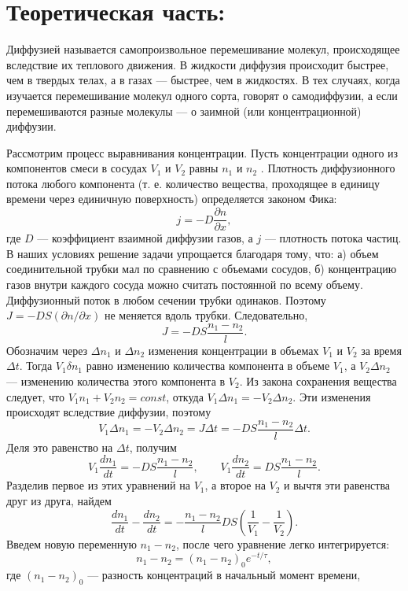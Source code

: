 \documentclass[a4paper, fontsize=12bp]{article}
\begin{document}
\section*{Теоретическая часть:}
Диффузией называется самопроизвольное перемешивание молекул, происходящее вследствие их теплового движения. В жидкости
диффузия происходит быстрее, чем в твердых телах, а в газах --- быстрее, чем в жидкостях. В тех случаях, когда изучается перемешивание молекул одного сорта, говорят о самодиффузии, а если перемешиваются разные молекулы --- о заимной (или концентрационной)
диффузии.

Рассмотрим процесс выравнивания концентрации. Пусть концентрации одного из компонентов смеси в сосудах $V_1$ и $V_2$ равны $n_1$ и
$n_2$ . Плотность диффузионного потока любого компонента (т. е. количество вещества, проходящее в единицу времени через единичную
поверхность) определяется законом Фика:
\[
j = - D \frac{\partial n}{\partial x},
\]
где $D$ --- коэффициент взаимной диффузии газов, а $j$ --- плотность
потока частиц. В наших условиях решение задачи упрощается благодаря тому, что: а) объем соединительной трубки мал по сравнению
с объемами сосудов, б) концентрацию газов внутри каждого сосуда
можно считать постоянной по всему объему. Диффузионный поток в
любом сечении трубки одинаков. Поэтому $J = - D S (\partial n / \partial x )$ не меняется вдоль трубки. Следовательно,
\[
	J = - D S \frac{n_1 - n_2}{l}.
\]
Обозначим через $\Delta n_1$ и $\Delta n_2$  изменения концентрации в объемах $V_1$ и $V_2$ за время $\Delta t$. Тогда $V_1 \delta n_1$ равно изменению количества компонента в объеме $V_1$, а $V_2 \Delta n_2$ --- изменению количества этого компонента в $V_2$. Из закона сохранения вещества следует, что $V_1 n_1 + V_2 n_2 = const$, откуда $V_1 \Delta n_1 = - V_2 \Delta n_2$. Эти изменения происходят вследствие диффузии, поэтому
\[
	V_1 \Delta n_1 = -V_2 \Delta n_2 = J \Delta t = -DS \frac{n_1 - n_2}{l} \Delta t.
\]
Деля это равенство на $\Delta t$, получим
\[
	V_1 \frac{dn_1}{dt} = -DS\frac{n_1 - n_2}{l}, \qquad V_1 \frac{dn_2}{dt} = DS\frac{n_1 - n_2}{l}.
\]
Разделив первое из этих уравнений на $V_1$, а второе на $V_2$ и вычтя эти равенства друг из друга, найдем
\[
	\frac{dn_1}{dt} - \frac{dn_2}{dt} = -\frac{n_1 - n_2}{l}DS \left( \frac{1}{V_1} - \frac{1}{V_2} \right).
\]
Введем новую переменную $n_1 - n_2$, после чего уравнение легко интегрируется:
\begin{equation}
\label{1}
	n_1 - n_2 = {(n_1 - n_2)}_0e^{-t/\tau},
\end{equation}
где ${(n_1 - n_2)}_0$ --- разность концентраций в начальный момент времени,
\end{document}
